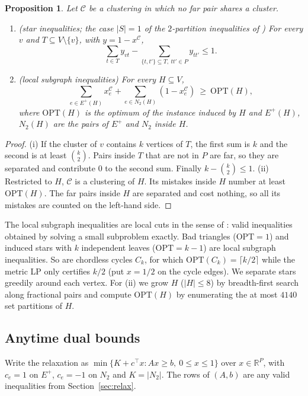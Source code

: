 \documentclass[11pt]{article}
\newtheorem{proposition}[theorem]{Proposition}
\theoremstyle{definition}
\newcommand{\OPT}{\mathrm{OPT}}
\newcommand{\Ep}{E^{+}}
\newcommand{\Nt}{N_{2}}
\newcommand{\R}{\mathbb{R}}
\begin{document}
\begin{proposition}\label{prop:subgraph}
Let $\mathcal C$ be a clustering in which no far pair shares a cluster.
\begin{enumerate}
\item[(i)] (star inequalities; the case $|S|=1$ of the $2$-partition
inequalities of \citet{GrotschelW89}) For every $v$ and $T\subseteq V\setminus\{v\}$, with
$y=1-x^{\mathcal C}$,
\[\textstyle\sum_{t\in T}y_{vt}-\sum_{\{t,t'\}\subseteq T,\ tt'\in P}y_{tt'}\le 1.\]
\item[(ii)] (local subgraph inequalities) For every $H\subseteq V$,
\[\textstyle\sum_{e\in\Ep(H)}x^{\mathcal C}_e+\sum_{e\in\Nt(H)}(1-x^{\mathcal C}_e)\ \ge\ \OPT(H),\]
where $\OPT(H)$ is the optimum of the instance induced by $H$ and $\Ep(H)$,
$\Nt(H)$ are the pairs of $\Ep$ and $\Nt$ inside $H$.
\end{enumerate}
\end{proposition}
\begin{proof}
(i) If the cluster of $v$ contains $k$ vertices of $T$, the first sum is $k$
and the second is at least $\binom k2$.  Pairs inside $T$ that are not in $P$
are far, so they are separated and contribute $0$ to the second sum.
Finally $k-\binom k2\le1$.  (ii) Restricted to $H$, $\mathcal C$ is a clustering
of $H$.  Its mistakes inside $H$ number at least $\OPT(H)$.  The far pairs
inside $H$ are separated and cost nothing, so all its mistakes are counted
on the left-hand side.
\end{proof}

The local subgraph inequalities are local cuts in the sense of
\citet{ApplegateBCC01localcuts}: valid inequalities obtained by solving a small
subproblem exactly.  Bad triangles ($\OPT=1$) and induced stars with $k$ independent leaves
($\OPT=k-1$) are local subgraph inequalities.  So are chordless cycles $C_k$,
for which $\OPT(C_k)=\lceil k/2\rceil$ while the metric LP only certifies
$k/2$ (put $x=1/2$ on the cycle edges).  We separate stars greedily around
each vertex.  For (ii) we grow $H$ ($|H|\le 8$) by breadth-first search along
fractional pairs and compute $\OPT(H)$ by enumerating the at most $4140$
set partitions of $H$.

\subsection{Anytime dual bounds}\label{sec:dual}

Write the relaxation as $\min\{K+c^\top x: Ax\ge b,\ 0\le x\le 1\}$ over
$x\in\R^P$, with $c_e=1$ on $\Ep$, $c_e=-1$ on $\Nt$ and $K=|\Nt|$.  The rows
of $(A,b)$ are any valid inequalities from Section~\ref{sec:relax}.
\end{document}
